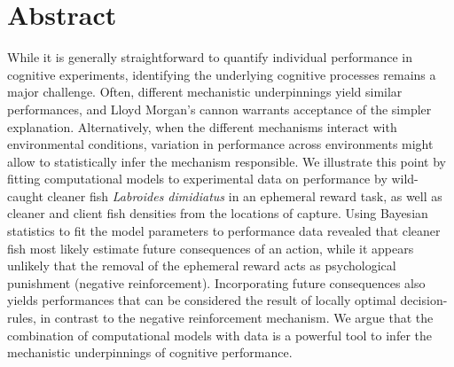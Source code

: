 \documentclass[10pt,letterpaper]{article}
\newcommand{\getIndex}[2]{
  \ForEach{,}{\IfEq{#1}{\thislevelitem}{\number\thislevelcount\ExitForEach}{}}{#2}
}
\newcommand{\getAff}[1]{
  \getIndex{#1}{a,b}
}
\begin{document}
\vspace*{0.2in}


\section*{Abstract}
While it is generally straightforward to quantify individual performance
in cognitive experiments, identifying the underlying cognitive processes
remains a major challenge. Often, different mechanistic underpinnings
yield similar performances, and Lloyd Morgan's cannon warrants
acceptance of the simpler explanation. Alternatively, when the different
mechanisms interact with environmental conditions, variation in
performance across environments might allow to statistically infer the
mechanism responsible. We illustrate this point by fitting computational
models to experimental data on performance by wild-caught cleaner fish
\emph{Labroides dimidiatus} in an ephemeral reward task, as well as
cleaner and client fish densities from the locations of capture. Using
Bayesian statistics to fit the model parameters to performance data
revealed that cleaner fish most likely estimate future consequences of
an action, while it appears unlikely that the removal of the ephemeral
reward acts as psychological punishment (negative reinforcement).
Incorporating future consequences also yields performances that can be
considered the result of locally optimal decision-rules, in contrast to
the negative reinforcement mechanism. We argue that the combination of
computational models with data is a powerful tool to infer the
mechanistic underpinnings of cognitive performance.
\end{document}
